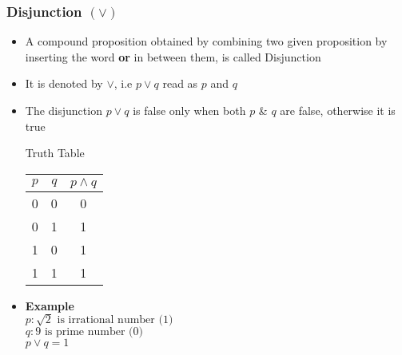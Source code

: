 \documentclass{article}
\begin{document}
	\subsubsection{Disjunction $(\lor)$}
	\begin{itemize}
		\item A compound proposition obtained by combining two given proposition by inserting the word
			\textbf{or} in between them, is called Disjunction
		\item It is denoted by $\lor$, i.e $p\lor q$ read as $p$ and $q$
		\item The disjunction $p\lor q$ is false only when both $p$ \& $q$ are false, otherwise it is
			true
			\begin{center}
				Truth Table \\ \vspace{1em}
				\begin{tabular}{|c|c|c|} \hline
					$p$ &  $q$ & $p\land q$ \\ \hline
					0 & 0 & 0 \\
					0 & 1 & 1 \\
					1 & 0 & 1 \\
					1 & 1 & 1 \\ \hline
				\end{tabular}
			\end{center}
		\item [] \textbf{Example} \\
			$p : \sqrt{2}\text{ is irrational number (1)}$ \\
			$q : 9\text{ is prime number (0)}$ \\
			$p\lor q=1$
	\end{itemize}
\end{document}
